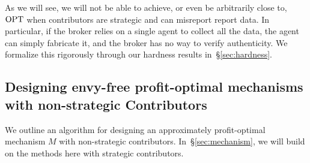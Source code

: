 As we will see, we will not be able to achieve, or even be arbitrarily close to, ${\rm OPT}$
when contributors are strategic and can misreport report data.
In particular, if the broker relies on a single agent to collect all the data, the agent can simply fabricate it, and the broker has no way to verify authenticity.
We formalize this rigorously through our hardness results in~\S\ref{sec:hardness}. 













\subsection{Designing envy-free profit-optimal mechanisms with non-strategic Contributors}
\label{sec:nonstrategicalgo}

We outline an algorithm for designing an approximately profit-optimal mechanism $M$ with non-strategic contributors. 
In~\S\ref{sec:mechanism}, we will build on the methods here with strategic contributors.



